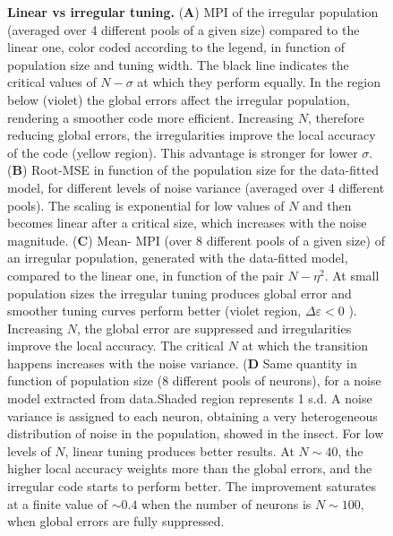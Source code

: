 \documentclass[a4paper]{article}%
\begin{document}
\begin{figure}[ptb]
\centering
{}\caption{\textbf{Linear vs
irregular tuning.} (\textbf{A}) MPI of the irregular population (averaged over
4 different pools of a given size) compared to the linear one, color coded
according to the legend, in function of population size and tuning width. The
black line indicates the critical values of $N-\sigma$ at which they perform
equally. In the region below (violet) the global errors affect the irregular
population, rendering a smoother code more efficient. Increasing $N$,
therefore reducing global errors, the irregularities improve the local
accuracy of the code (yellow region). This advantage is stronger for lower
$\sigma$. (\textbf{B}) Root-MSE in function of the population size for the
data-fitted model, for different levels of noise variance (averaged over 4
different pools). The scaling is exponential for low values of $N$ and then
becomes linear after a critical size, which increases with the noise
magnitude. (\textbf{C}) Mean- MPI (over 8 different pools of a given size) of
an irregular population, generated with the data-fitted model, compared to the
linear one, in function of the pair $N-\eta^{2}$. At small population sizes
the irregular tuning produces global error and smoother tuning curves perform
better (violet region, $\Delta\varepsilon<0 $ ). Increasing $N$, the global
error are suppressed and irregularities improve the local accuracy. The
critical $N$ at which the transition happens increases with the noise
variance. (\textbf{D} Same quantity in function of population size (8
different pools of neurons), for a noise model extracted from data.Shaded
region represents 1 s.d. A noise variance is assigned to each neuron,
obtaining a very heterogeneous distribution of noise in the population, showed
in the insect. For low levels of $N$, linear tuning produces better results.
At $N\sim40$, the higher local accuracy weights more than the global errors,
and the irregular code starts to perform better. The improvement saturates at
a finite value of $\sim0.4$ when the number of neurons is $N\sim100$, when
global errors are fully suppressed. }%
\label{Fig:6}%
\end{figure}\clearpage
\end{document}
